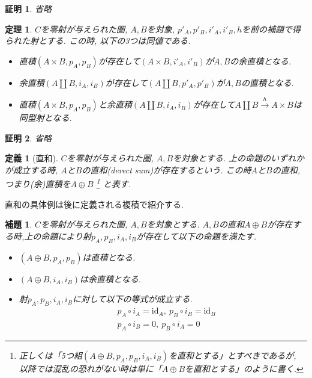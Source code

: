 \documentclass[a4paper,12pt]{ltjsarticle}
\theoremstyle{break}
\newtheorem{defn}[thm]{定義}
\newtheorem{lem}[thm]{補題}
\newtheorem{thrm}[thm]{定理}
\newtheorem*{prf}{証明}
\newcommand{\xr}[1]{\xrightarrow{#1}}
\newcommand{\id}{\mathrm{id}}
\newcommand{\ci}{\circ}
\newcommand{\ti}{\times}
\newcommand{\opl}{\oplus}
\newcommand{\am}{\amalg}
\numberwithin{equation}{section}
\begin{document}
\begin{prf}
  省略
\end{prf}

\begin{thrm}
  $C$を零射が与えられた圏, $A,B$を対象, $p'_A,p'_B,i'_A,i'_B,h$を前の補題で得られた射とする. 
  この時, 以下の3つは同値である.
  \begin{itemize}
    \item 直積$(A \ti B,p_A,p_B)$が存在して$(A \ti B,i'_A, i'_B)$が$A,B$の余直積となる.
    \item 余直積$(A \am B,i_A,i_B)$が存在して$(A \am B,p'_A, p'_B)$が$A,B$の直積となる.
    \item 直積$(A \ti B,p_A,p_B)$と余直積$(A \am B,i_A,i_B)$が存在して$A \am B \xr{h} A \ti B$は同型射となる. 
  \end{itemize} 
\end{thrm}

\begin{prf}
  省略
\end{prf}

\begin{defn}[直和]
  $C$を零射が与えられた圏, $A,B$を対象とする. 
  上の命題のいずれかが成立する時, $A$と$B$の直和(derect sum)が存在するという. 
  この時$A$と$B$の直和, つまり(余)直積を$A \opl B$
  \footnote{
    正しくは「5つ組$(A \opl B,p_A,p_B,i_A,i_B)$を直和とする」とすべきであるが, 以降では混乱の恐れがない時は単に「$A \opl B$を直和とする」のように書く. 
  }
  と表す. 
\end{defn}

直和の具体例は後に定義される複積で紹介する. 

\begin{lem}
  $C$を零射が与えられた圏, $A,B$を対象とする. 
  $A,B$の直和$A \opl B$が存在する時,上の命題により射$p_A,p_B,i_A,i_B$が存在して以下の命題を満たす. 
  \begin{itemize}
    \item $(A \opl B,p_A,p_B)$は直積となる. 
    \item $(A \opl B,i_A,i_B)$は余直積となる. 
    \item 射$p_A,p_B,i_A,i_B$に対して以下の等式が成立する. 
    \begin{align*}
      &p_A \ci i_A = \id_A, ~ p_B \ci i_B = \id_B \\
      &p_A \ci i_B = 0, ~ p_B \ci i_A = 0
    \end{align*}
  \end{itemize}
\end{lem}
\end{document}
